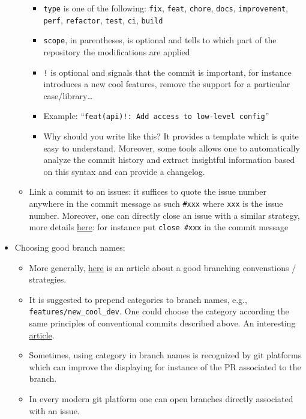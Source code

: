 \documentclass[a4paper,12pt,%
              final%
              ]{article}
\begin{document}
\begin{itemize}
\begin{itemize}
\begin{itemize}
          \item \texttt{type} is one of the following: \texttt{fix}, \texttt{feat}, \texttt{chore}, \texttt{docs}, \texttt{improvement}, \texttt{perf}, \texttt{refactor}, \texttt{test}, \texttt{ci}, \texttt{build}
          \item \texttt{scope}, in parentheses, is optional and tells to which part of the repository the modifications are applied
          \item \texttt{!} is optional and signals that the commit is important, for instance introduces a new cool features, remove the support for a particular case/library\ldots
          \item Example: ``\texttt{feat(api)!: Add access to low-level config}''
          \item Why should you write like this? It provides a template which is quite easy to understand. Moreover, some tools allows one to automatically analyze the commit history and extract insightful information based on this syntax and can provide a changelog.
        \end{itemize}
      \item Link a commit to an issues: it suffices to quote the issue number anywhere in the commit message as such \verb|#xxx| where \texttt{xxx} is the issue number. Moreover, one can directly close an issue with a similar strategy, more details \href{https://docs.github.com/en/issues/tracking-your-work-with-issues/linking-a-pull-request-to-an-issue}{here}: for instance put \verb|close #xxx| in the commit message
    \end{itemize}
  \item Choosing good branch names:
    \begin{itemize}
      \item More generally, \href{https://nvie.com/posts/a-successful-git-branching-model/}{here} is an article about a good branching convenstions / strategies.
      \item It is suggested to prepend categories to branch names, e.g., \verb|features/new_cool_dev|. One could choose the category according the same principles of conventional commits described above. An interesting \href{https://dev.to/varbsan/a-simplified-convention-for-naming-branches-and-commits-in-git-il4}{article}.
      \item Sometimes, using category in branch names is recognized by git platforms which can improve the displaying for instance of the PR associated to the branch.
      \item In every modern git platform one can open branches directly associated with an issue.

\end{itemize}
\end{itemize}
\end{document}
